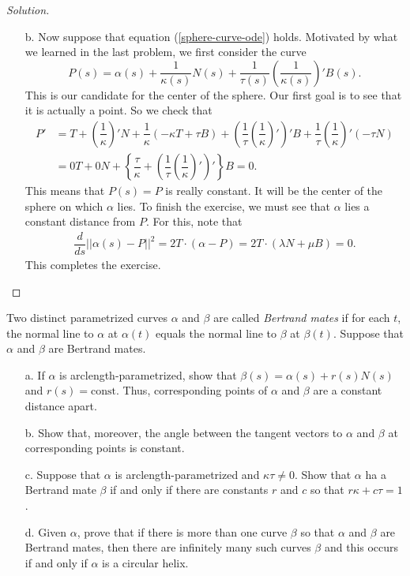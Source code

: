 \documentclass[Shifrin_Solutions_Spring_2018]{subfiles}
\begin{document}
\begin{proof}[Solution] {$\ $}
\begin{itemize}
\item[b.]  Now suppose that equation (\ref{sphere-curve-ode}) holds. Motivated by what we learned in the last problem, we first consider the curve
\[
P(s) = \alpha(s) + \dfrac{1}{\kappa(s)} N(s) + \dfrac{1}{\tau(s)}\left( \dfrac{1}{\kappa(s)}\right)' B(s) .
\]
This is our candidate for the center of the sphere. Our first goal is to see that it is actually a point. So we check that
\[
\begin{split}
P' &= T + \left(\dfrac{1}{\kappa}\right)' N + \dfrac{1}{\kappa} (-\kappa T + \tau B ) + \left(\dfrac{1}{\tau}\left( \dfrac{1}{\kappa}\right)'\right)' B + \dfrac{1}{\tau}\left(\dfrac{1}{\kappa}\right)' (-\tau N) \\
	& = 0 T + 0 N + \left\{  \dfrac{\tau}{\kappa} + \left(\dfrac{1}{\tau} \left(\dfrac{1}{\kappa}\right)' \right)' \right\} B = 0 .
\end{split}
\]
This means that $P(s) = P$ is really constant. It will be the center of the sphere on which $\alpha$ lies. To finish the exercise, we must see that $\alpha$ lies a constant distance from $P$. For this, note that
\[
\begin{split}
\dfrac{d}{ds} ||\alpha(s) - P||^2 = 2 T \cdot (\alpha-P) = 2 T \cdot ( \lambda N + \mu B) = 0.
\end{split}
\]
This completes the exercise.
\end{itemize}
\end{proof}

\vspace{.5cm}


\begin{exercise}
Two distinct parametrized curves $\alpha$ and $\beta$ are called \emph{Bertrand mates} if for each $t$, the normal line to $\alpha$ at $\alpha(t)$ equals the normal line to $\beta$ at $\beta(t)$. Suppose that $\alpha$ and $\beta$ are Bertrand mates.
\begin{itemize}
\item[a.] If $\alpha$ is arclength-parametrized, show that $\beta(s) = \alpha(s) + r(s) N(s)$ and $r(s) = \mbox{const}$. Thus, corresponding points of $\alpha$ and $\beta$ are a constant distance apart.
\item[b.] Show that, moreover, the angle between the tangent vectors to $\alpha$ and $\beta$ at corresponding points is constant.
\item[c.] Suppose that $\alpha$ is arclength-parametrized and $\kappa\tau \neq 0$. Show that $\alpha$ ha a Bertrand mate $\beta$ if and only if there are constants $r$ and $c$ so that $r\kappa + c\tau =1$.
\item[d.] Given $\alpha$, prove that if there is more than one curve $\beta$ so that $\alpha$ and $\beta$ are Bertrand mates, then there are infinitely many such curves $\beta$ and this occurs if and only if $\alpha$ is a circular helix.
\end{itemize}
\end{exercise}
\end{document}
